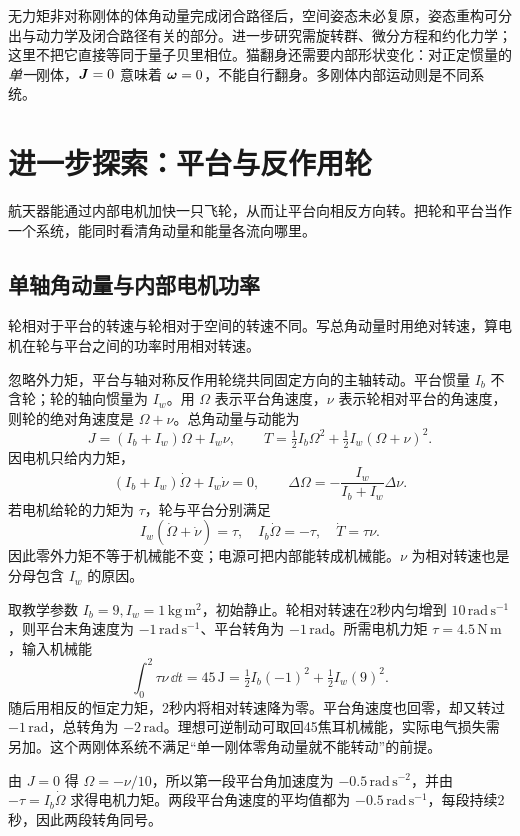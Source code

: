 \begin{modernbox}[title={进一步探索：几何相位与模型边界}]
无力矩非对称刚体的体角动量完成闭合路径后，空间姿态未必复原，姿态重构可分出与动力学及闭合路径有关的部分。进一步研究需旋转群、微分方程和约化力学；这里不把它直接等同于量子贝里相位。猫翻身还需要内部形状变化：对正定惯量的\emph{单一}刚体，$\boldsymbol{J}=0$ 意味着 $\boldsymbol{\omega}=0$，不能自行翻身。多刚体内部运动则是不同系统。
\end{modernbox}


\section{进一步探索：平台与反作用轮}
航天器能通过内部电机加快一只飞轮，从而让平台向相反方向转。把轮和平台当作一个系统，能同时看清角动量和能量各流向哪里。

\subsection{单轴角动量与内部电机功率}
轮相对于平台的转速与轮相对于空间的转速不同。写总角动量时用绝对转速，算电机在轮与平台之间的功率时用相对转速。

忽略外力矩，平台与轴对称反作用轮绕共同固定方向的主轴转动。平台惯量 $I_b$ 不含轮；轮的轴向惯量为 $I_w$。用 $\Omega$ 表示平台角速度，$\nu$ 表示轮相对平台的角速度，则轮的绝对角速度是 $\Omega+\nu$。总角动量与动能为
\[
J=(I_b+I_w)\Omega+I_w\nu,\qquad
T=\tfrac12I_b\Omega^2+\tfrac12I_w(\Omega+\nu)^2.
\]
因电机只给内力矩，
\begin{equation}
(I_b+I_w)\dot\Omega+I_w\dot\nu=0,\qquad
\Delta\Omega=-\frac{I_w}{I_b+I_w}\Delta\nu.
\label{eq:rigid-wheel}
\end{equation}
若电机给轮的力矩为 $\tau$，轮与平台分别满足
\[
I_w(\dot\Omega+\dot\nu)=\tau,\quad I_b\dot\Omega=-\tau,
\quad \dot T=\tau\nu.
\]
因此零外力矩不等于机械能不变；电源可把内部能转成机械能。$\nu$ 为相对转速也是分母包含 $I_w$ 的原因。

\begin{example}
取教学参数 $I_b=9,I_w=1\,\mathrm{kg\,m^2}$，初始静止。轮相对转速在2秒内匀增到 $10\,\mathrm{rad\,s^{-1}}$，则平台末角速度为 $-1\,\mathrm{rad\,s^{-1}}$、平台转角为 $-1\,\mathrm{rad}$。所需电机力矩 $\tau=4.5\,\mathrm{N\,m}$，输入机械能
\[
\int_0^2\tau\nu\,\dd t=45\,\mathrm J
=\tfrac12I_b(-1)^2+\tfrac12I_w(9)^2.
\]
随后用相反的恒定力矩，2秒内将相对转速降为零。平台角速度也回零，却又转过 $-1\,\mathrm{rad}$，总转角为 $-2\,\mathrm{rad}$。理想可逆制动可取回45焦耳机械能，实际电气损失需另加。这个两刚体系统不满足“单一刚体零角动量就不能转动”的前提。

由 $J=0$ 得 $\Omega=-\nu/10$，所以第一段平台角加速度为 $-0.5\,\mathrm{rad\,s^{-2}}$，并由 $-\tau=I_b\dot\Omega$ 求得电机力矩。两段平台角速度的平均值都为 $-0.5\,\mathrm{rad\,s^{-1}}$，每段持续2秒，因此两段转角同号。
\end{example}

